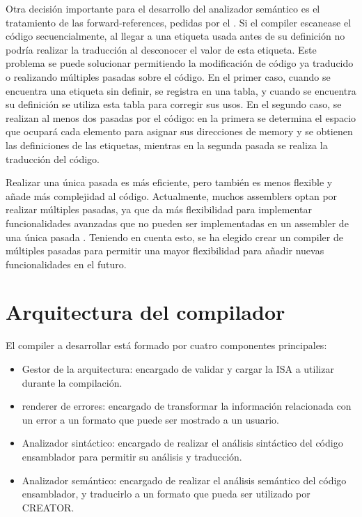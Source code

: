 Otra decisión importante para el desarrollo del analizador semántico es el
tratamiento de las \glspl{forward-reference}, pedidas por el
. Si el \gls{compiler} escanease el código
secuencialmente, al llegar a una etiqueta usada antes de su definición no podría
realizar la traducción al desconocer el valor de esta etiqueta. Este problema se
puede solucionar permitiendo la modificación de código ya traducido o realizando
múltiples pasadas sobre el código. En el primer caso, cuando se encuentra una
etiqueta sin definir, se registra en una tabla, y cuando se encuentra su
definición se utiliza esta tabla para corregir sus usos. En el segundo caso, se
realizan al menos dos pasadas por el código: en la primera se determina el
espacio que ocupará cada elemento para asignar sus direcciones de \gls{memory} y
se obtienen las definiciones de las etiquetas, mientras en la segunda pasada se
realiza la traducción del código. \parencite{assembler-design}

Realizar una única pasada es más eficiente, pero también es menos flexible y
añade más complejidad al código. Actualmente, muchos \glspl{assembler} optan por
realizar múltiples pasadas, ya que da más flexibilidad para implementar
funcionalidades avanzadas que no pueden ser implementadas en un \gls{assembler}
de una única pasada \parencite{assembler-design}. Teniendo en cuenta esto, se ha
elegido crear un \gls{compiler} de múltiples pasadas para permitir una mayor
flexibilidad para añadir nuevas funcionalidades en el futuro.

\section{Arquitectura del compilador}\label{sec:architecture}

\noindent
El \gls{compiler} a desarrollar está formado por cuatro componentes principales:

\begin{itemize}
    \item Gestor de la arquitectura: encargado de validar y cargar la \gls{ISA}
    a utilizar durante la compilación.
    \item \Gls{renderer} de errores: encargado de transformar la información
    relacionada con un error a un formato que puede ser mostrado a un usuario.
    \item Analizador sintáctico: encargado de realizar el análisis sintáctico del
    código ensamblador para permitir su análisis y traducción.
    \item Analizador semántico: encargado de realizar el análisis semántico del
    código ensamblador, y traducirlo a un formato que pueda ser utilizado por
    CREATOR.
\end{itemize}


